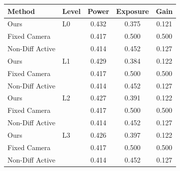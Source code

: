 \begin{tabular}{llccc}
\toprule
Method & Level & Power & Exposure & Gain \\
\midrule
Ours & L0 & 0.432 & 0.375 & 0.121 \\
Fixed Camera &  & 0.417 & 0.500 & 0.500 \\
Non-Diff Active &  & 0.414 & 0.452 & 0.127 \\
\midrule
Ours & L1 & 0.429 & 0.384 & 0.122 \\
Fixed Camera &  & 0.417 & 0.500 & 0.500 \\
Non-Diff Active &  & 0.414 & 0.452 & 0.127 \\
\midrule
Ours & L2 & 0.427 & 0.391 & 0.122 \\
Fixed Camera &  & 0.417 & 0.500 & 0.500 \\
Non-Diff Active &  & 0.414 & 0.452 & 0.127 \\
\midrule
Ours & L3 & 0.426 & 0.397 & 0.122 \\
Fixed Camera &  & 0.417 & 0.500 & 0.500 \\
Non-Diff Active &  & 0.414 & 0.452 & 0.127 \\
\bottomrule
\end{tabular}